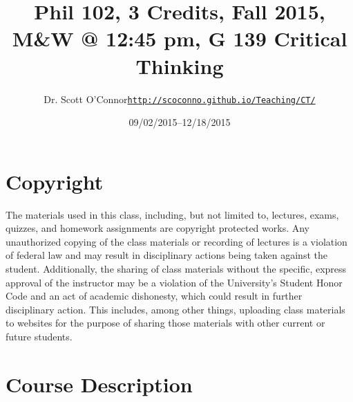 \documentclass[article,oneside]{memoir}
\makeatletter
\def\myauthor{Author}
\def\mytitle{Title}
\def\mycopyright{\myauthor}
\def\myweb{\href{http://scoconno.github.io/Teaching/CT/}{http://scoconno.github.io/Teaching/CT/}}
\def\myauthor{Dr. Scott O'Connor}
\def\mytitle{{\normalsize Phil 102, 3 Credits, Fall 2015, M\&W @ 12:45 pm, G 139 \newline} \HUGE Critical Thinking}
\makeatother
\begin{document}
\setsansfont[Mapping=tex-text]{Georgia} 
\setmonofont[Mapping=tex-text,Scale=0.8]{Georgia} 

\def\ind{\hangindent=1 true cm\hangafter=1 \noindent}
\def\labelitemi{$\cdot$}

\pagestyle{kjh}

\title{\LARGE \mytitle}     
\author{\Large\myauthor \newline \footnotesize\texttt{\noindent\myweb}}
\date{09/02/2015--12/18/2015}

\published{\,}

\maketitle




%
%

\section{Copyright}
The materials used in this class, including, but not limited to, lectures, exams, quizzes, and homework assignments are copyright protected works.  Any unauthorized copying of the class materials or recording of lectures is a violation of federal law and may result in disciplinary actions being taken against the student.  Additionally, the sharing of class materials without the specific, express approval of the instructor may be a violation of the University's Student Honor Code and an act of academic dishonesty, which could result in further disciplinary action.  This includes, among other things, uploading class materials to websites for the purpose of sharing those materials with other current or future students.  

\section{Course Description}
\end{document}
